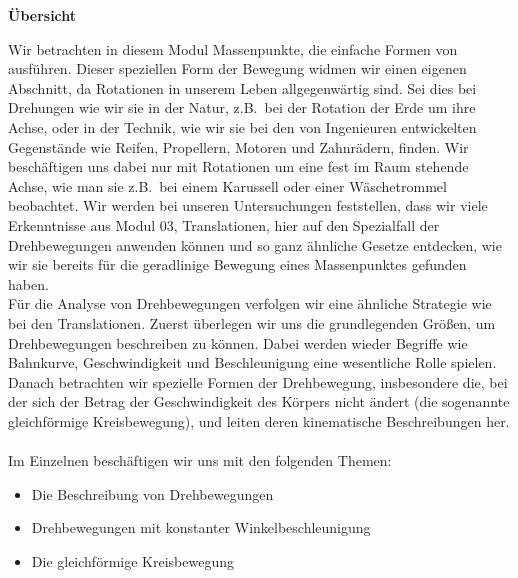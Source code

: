 



\MSetSubject{\MINTPhysics}


\begin{MSectionStart}
\ifttm \else 

\begin{center}
\textbf{\huge \"Ubersicht}
\end{center}
\fi


Wir betrachten in diesem Modul Massenpunkte, die einfache Formen von  ausf\"uhren. Dieser speziellen Form der Bewegung widmen wir einen eigenen Abschnitt, da Rotationen in unserem Leben allgegenw\"artig sind. Sei dies bei Drehungen wie wir sie in der Natur, z.B.~bei der Rotation der Erde um ihre Achse, oder in der Technik, wie wir sie bei den von Ingenieuren entwickelten Gegenst\"ande wie Reifen, Propellern, Motoren und Zahnr\"adern, finden. Wir besch\"aftigen uns dabei nur mit Rotationen um eine fest im Raum stehende Achse, wie man sie z.B.~bei einem Karussell oder einer W\"aschetrommel beobachtet. Wir werden bei unseren Untersuchungen feststellen, dass wir viele Erkenntnisse aus Modul 03, Translationen, hier auf den Spezialfall der Drehbewegungen anwenden k\"onnen und so ganz \"ahnliche Gesetze entdecken, wie wir sie bereits f\"ur die geradlinige Bewegung eines Massenpunktes gefunden haben.\\
F\"ur die Analyse von Drehbewegungen verfolgen wir eine \"ahnliche Strategie wie bei den Translationen. Zuerst \"uberlegen wir uns die grundlegenden Gr\"o{\ss}en, um Drehbewegungen beschreiben zu k\"onnen. Dabei werden wieder Begriffe wie Bahnkurve, Geschwindigkeit und Beschleunigung eine wesentliche Rolle spielen. Danach betrachten wir spezielle Formen der Drehbewegung, insbesondere die, bei der sich der Betrag der Geschwindigkeit des K\"orpers nicht \"andert (die sogenannte gleichf\"ormige Kreisbewegung), und leiten deren kinematische Beschreibungen her. 
\ \\[0.5cm]

 Im Einzelnen besch\"aftigen wir uns mit den folgenden Themen:
  
\begin{itemize}
\item Die Beschreibung von Drehbewegungen
\item Drehbewegungen mit konstanter Winkelbeschleunigung
\item Die gleichf\"ormige Kreisbewegung
\end{itemize}


\end{MSectionStart}
